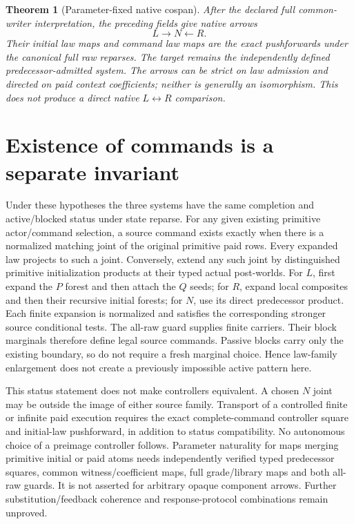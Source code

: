 \documentclass[11pt]{article}\usepackage{amsmath,amssymb,amsthm,geometry}\geometry{margin=1in}
\newtheorem{theorem}{Theorem}
\begin{document}
\begin{theorem}[Parameter-fixed native cospan]
After the declared full common-writer interpretation, the preceding fields give native arrows
\[
                         L\longrightarrow N\longleftarrow R.
\]
Their initial law maps and command law maps are the exact pushforwards under the canonical full raw reparses. The target remains the independently defined predecessor-admitted system. The arrows can be strict on law admission and directed on paid context coefficients; neither is generally an isomorphism. This does not produce a direct native $L\leftrightarrow R$ comparison.
\end{theorem}

\section{Existence of commands is a separate invariant}
Under these hypotheses the three systems have the same completion and active/blocked status under state reparse. For any given existing primitive actor/command selection, a source command exists exactly when there is a normalized matching joint of the original primitive paid rows. Every expanded law projects to such a joint. Conversely, extend any such joint by distinguished primitive initialization products at their typed actual post-worlds. For $L$, first expand the $P$ forest and then attach the $Q$ seeds; for $R$, expand local composites and then their recursive initial forests; for $N$, use its direct predecessor product. Each finite expansion is normalized and satisfies the corresponding stronger source conditional tests. The all-raw guard supplies finite carriers. Their block marginals therefore define legal source commands. Passive blocks carry only the existing boundary, so do not require a fresh marginal choice. Hence law-family enlargement does not create a previously impossible active pattern here.

This status statement does not make controllers equivalent. A chosen $N$ joint may be outside the image of either source family. Transport of a controlled finite or infinite paid execution requires the exact complete-command controller square and initial-law pushforward, in addition to status compatibility. No autonomous choice of a preimage controller follows. Parameter naturality for maps merging primitive initial or paid atoms needs independently verified typed predecessor squares, common witness/coefficient maps, full grade/library maps and both all-raw guards. It is not asserted for arbitrary opaque component arrows. Further substitution/feedback coherence and response-protocol combinations remain unproved.
\end{document}
